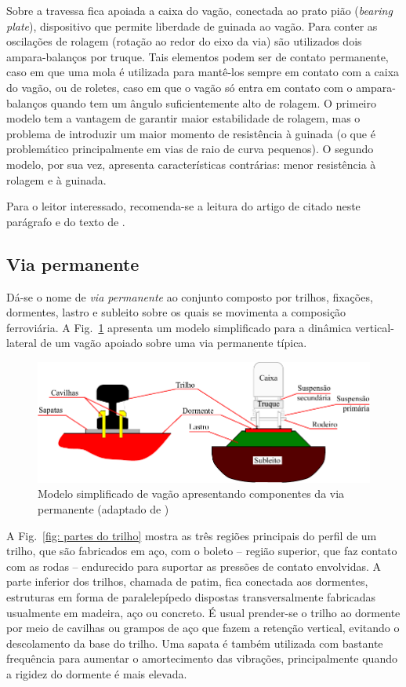 Sobre a travessa fica apoiada a caixa do vagão, conectada ao prato pião (\textit{bearing plate}), dispositivo que permite liberdade de guinada ao vagão. Para conter as oscilações de rolagem (rotação ao redor do eixo da via) são utilizados dois ampara-balanços por truque. Tais elementos podem ser de contato permanente, caso em que uma mola é utilizada para mantê-los sempre em contato com a caixa do vagão, ou de roletes, caso em que o vagão só entra em contato com o ampara-balanços quando tem um ângulo suficientemente alto de rolagem. O primeiro modelo tem a vantagem de garantir maior estabilidade de rolagem, mas o problema de introduzir um maior momento de resistência à guinada (o que é problemático principalmente em vias de raio de curva pequenos). O segundo modelo, por sua vez, apresenta características contrárias: menor resistência à rolagem e à guinada.

Para o leitor interessado, recomenda-se a leitura do artigo de \citeauthor{hawthorne_recent_1996} citado neste parágrafo e do texto de .

\subsection{Via permanente}
Dá-se o nome de \textit{via permanente} ao conjunto composto por trilhos, fixações, dormentes, lastro e subleito sobre os quais se movimenta a composição ferroviária. A Fig.~\ref{fig:comps da via permanente} apresenta um modelo simplificado para a dinâmica vertical-lateral de um vagão apoiado sobre uma via permanente típica.

\begin{figure}[]
 \centering
 \includegraphics{Cap_2/Figuras/viaPermanente_comps.pdf}
 \caption{Modelo simplificado de vagão apresentando componentes da via permanente (adaptado de )}
 \label{fig:comps da via permanente}
\end{figure}

A Fig.~\ref{fig: partes do trilho} mostra as três regiões principais do perfil de um trilho, que são fabricados em aço, com o boleto -- região superior, que faz contato com as rodas -- endurecido para suportar as pressões de contato envolvidas. A parte inferior dos trilhos, chamada de patim, fica conectada aos dormentes, estruturas em forma de paralelepípedo dispostas transversalmente fabricadas usualmente em madeira, aço ou concreto. É usual prender-se o trilho ao dormente por meio de cavilhas ou grampos de aço que fazem a retenção vertical, evitando o descolamento da base do trilho. Uma sapata é também utilizada com bastante frequência para aumentar o amortecimento das vibrações, principalmente quando a rigidez do dormente é mais elevada.


